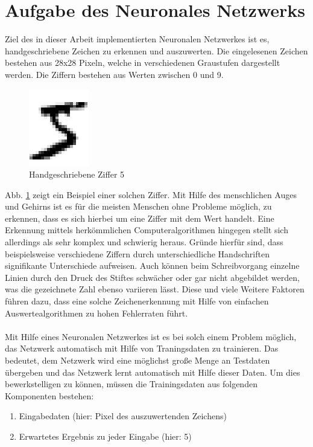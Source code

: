 \section{Aufgabe des Neuronales Netzwerks}
Ziel des in dieser Arbeit implementierten Neuronalen Netzwerkes ist es, handgeschriebene Zeichen zu erkennen und auszuwerten. Die eingelesenen Zeichen bestehen aus 28x28 Pixeln, welche in verschiedenen Graustufen dargestellt werden. Die Ziffern bestehen aus Werten zwischen 0 und 9. 
\begin{figure}[hbt]
	\centering
	\includegraphics[scale=0.6]{Bilder/handdrawn_digit}
	\caption{Handgeschriebene Ziffer 5} 
	\label{fig:handwritten_digit_5} 
\end{figure}
Abb. \ref{fig:handwritten_digit_5} zeigt ein Beispiel einer solchen Ziffer. Mit Hilfe des menschlichen Auges und Gehirns ist es für die meisten Menschen ohne Probleme möglich, zu erkennen, dass es sich hierbei um eine Ziffer mit dem Wert \grqq handelt. Eine Erkennung mittels herkömmlichen Computeralgorithmen hingegen stellt sich allerdings als sehr komplex und schwierig heraus. Gründe hierfür sind, dass beispielsweise verschiedene Ziffern durch unterschiedliche Handschriften signifikante Unterschiede aufweisen. Auch können beim Schreibvorgang einzelne Linien durch den Druck des Stiftes schwächer oder gar nicht abgebildet werden, was die gezeichnete Zahl ebenso variieren lässt. Diese und viele Weitere Faktoren führen dazu, dass eine solche Zeichenerkennung mit Hilfe von einfachen Auswertealgorithmen zu hohen Fehlerraten führt. \\ \\
Mit Hilfe eines Neuronalen Netzwerkes ist es bei solch einem Problem möglich, das Netzwerk automatisch mit Hilfe von Traningsdaten zu trainieren. Das bedeutet, dem Netzwerk wird eine möglichst große Menge an Testdaten übergeben und das Netzwerk lernt automatisch mit Hilfe dieser Daten. Um dies bewerkstelligen zu können, müssen die Trainingsdaten aus folgenden Komponenten bestehen:
\begin{enumerate}
\item Eingabedaten (hier: Pixel des auszuwertenden Zeichens)
\item Erwartetes Ergebnis zu jeder Eingabe (hier: 5)
\end{enumerate}


